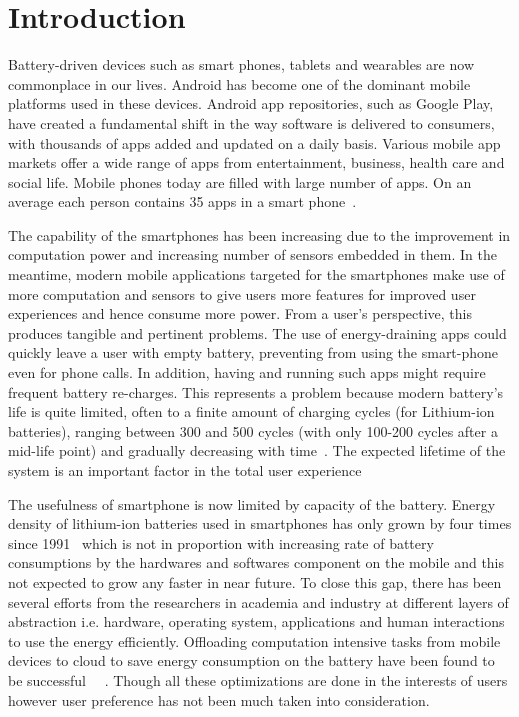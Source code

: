 \section{Introduction}
\label{intro}


Battery-driven devices such as smart phones, tablets and wearables are now commonplace in our lives. Android has become one of the dominant mobile platforms used in these devices. Android app repositories, such as Google Play, have created a fundamental shift in the way software is delivered to consumers, with thousands of apps added and updated on a daily basis. Various mobile app markets offer a wide range of apps from entertainment, business, health care and social life. Mobile phones today are filled with large number of apps. On an average each person contains 35 apps in a smart phone~\cite{thinkwithgoogle}. 

The capability of the smartphones has been increasing due to the improvement in  computation power and increasing number of sensors embedded in them. In the meantime, modern mobile applications targeted for the smartphones make use of more computation and sensors to give users more features for improved user experiences  and hence consume more power. From a user’s perspective, this produces tangible and pertinent problems. The use of energy-draining apps could quickly leave a user with empty battery, preventing from using the smart-phone even for phone calls. In addition, having and running such apps might require frequent battery re-charges. This represents a problem because modern battery’s life is quite limited, often to a finite amount of charging cycles (for Lithium-ion batteries), ranging between 300 and 500 cycles (with only 100-200 cycles after a mid-life point) and gradually decreasing with time~\cite{linares2014mining}. The expected lifetime of the system is an important factor in the total user experience ~\cite{kim2013event} ~\cite{li2013energy}

The usefulness of smartphone is now limited by capacity of the battery.
Energy density of lithium-ion batteries used in smartphones has only grown by four times since 1991~\cite{janek2016solid} which is not in proportion with increasing rate of battery consumptions by the hardwares and softwares component on the mobile and this not expected to grow any faster in near future. To close this gap, there has been several efforts from the researchers in academia and industry at different  layers of abstraction i.e. hardware, operating system,  applications  and human interactions to use the energy efficiently. Offloading computation intensive tasks from mobile devices to cloud to save energy consumption on the battery have been found to be successful~\cite{lai2017furion} ~\cite{boos2016flashback}. Though all these optimizations are done in the interests of  users however user preference has not been much taken into consideration.
 
